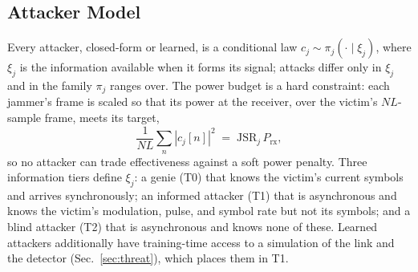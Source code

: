 \subsection{Attacker Model}
\label{sec:attacker}
Every attacker, closed-form or learned, is a conditional law $c_j\sim\pi_j(\cdot\mid\xi_j)$, where $\xi_j$ is the information available when it forms its signal; attacks differ only in $\xi_j$ and in the family $\pi_j$ ranges over.
The power budget is a hard constraint: each jammer's frame is scaled so that its power at the receiver, over the victim's $NL$-sample frame, meets its target,
\begin{equation}
\frac{1}{N L}\sum_{n}|c_j[n]|^2 \;=\; \mathrm{JSR}_j\,P_{\mathrm{rx}},
\label{eq:power}
\end{equation}
so no attacker can trade effectiveness against a soft power penalty.
Three information tiers define $\xi_j$: a genie (T0) that knows the victim's current symbols and arrives synchronously; an informed attacker (T1) that is asynchronous and knows the victim's modulation, pulse, and symbol rate but not its symbols; and a blind attacker (T2) that is asynchronous and knows none of these.
Learned attackers additionally have training-time access to a simulation of the link and the detector (Sec.~\ref{sec:threat}), which places them in T1.

